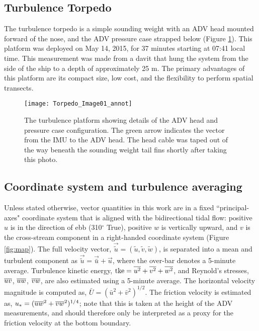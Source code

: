 \subsection{Turbulence Torpedo}

The turbulence torpedo is a simple sounding weight with an ADV head mounted forward of the nose, and the ADV pressure case strapped below (Figure \ref{fig:torpedo}). This platform was deployed on May 14, 2015, for 37 minutes starting at 07:41 local time.  This measurement was made from a davit that hung the system from the side of the ship to a depth of approximately 25 m. The primary advantages of this platform are its compact size, low cost, and the flexibility to perform spatial transects.  

\begin{figure}[th]
  \centering
  \texttt{[image: Torpedo\_Image01\_annot]}
  \caption{The turbulence platform showing details of the ADV head and pressure case configuration. The green arrow indicates the vector from the IMU to the ADV head. The head cable was taped out of the way beneath the sounding weight tail fins shortly after taking this photo.}
  \label{fig:torpedo}
\end{figure}

\subsection{Coordinate system and turbulence averaging}

Unless stated otherwise, vector quantities in this work are in a fixed ``principal-axes" coordinate system that is aligned with the bidirectional tidal flow: positive $u$ is in the direction of ebb (310$^\circ$ True), positive $w$ is vertically upward, and $v$ is the cross-stream component in a right-handed coordinate system (Figure \ref{fig:map}). The full velocity vector, $\vec{\tilde{u}} = (\tilde{u}, \tilde{v}, \tilde{w})$, is separated into a mean and turbulent component as $\vec{\tilde{u}} = \vec{\bar{u}} + \vec{u}$, where the over-bar denotes a 5-minute average. Turbulence kinetic energy, $\mathrm{tke} = \overline{u^2} + \overline{v^2}+\overline{w^2}$, and Reynold's stresses, $\overline{uv}$, $\overline{uw}$, $\overline{vw}$, are also estimated using a 5-minute average.  The horizontal velocity magnitude is computed as, $\bar{U} = (\bar{u}^2+\bar{v}^2)^{1/2}$. The friction velocity is estimated as, $u_* = (\overline{uw}^2+\overline{vw}^2)^{1/4}$; note that this is taken at the height of the ADV measurements, and should therefore only be interpreted as a proxy for the friction velocity at the bottom boundary.

